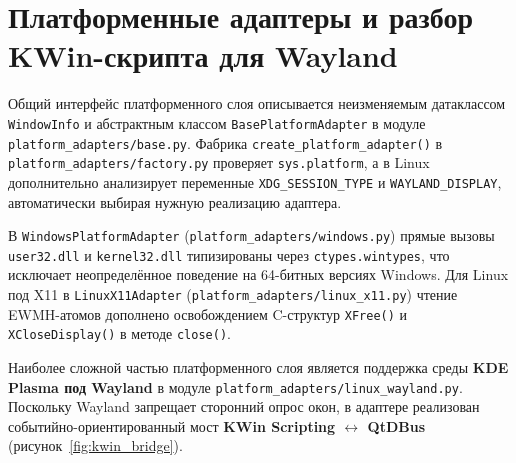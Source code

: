 \documentclass{timcw}
\begin{document}
\section{Платформенные адаптеры и разбор KWin-скрипта для Wayland}

Общий интерфейс платформенного слоя описывается неизменяемым датаклассом \texttt{WindowInfo} и абстрактным классом \texttt{BasePlatformAdapter} в модуле \texttt{platform\_adapters/base.py}. Фабрика \texttt{create\_platform\_adapter()} в \texttt{platform\_adapters/factory.py} проверяет \texttt{sys.platform}, а в Linux дополнительно анализирует переменные \texttt{XDG\_SESSION\_TYPE} и \texttt{WAYLAND\_DISPLAY}, автоматически выбирая нужную реализацию адаптера.

В \texttt{WindowsPlatformAdapter} (\texttt{platform\_adapters/windows.py}) прямые вызовы \texttt{user32.dll} и \texttt{kernel32.dll} типизированы через \texttt{ctypes.wintypes}, что исключает неопределённое поведение на 64-битных версиях Windows. Для Linux под X11 в \texttt{LinuxX11Adapter} (\texttt{platform\_adapters/linux\_x11.py}) чтение EWMH-атомов дополнено освобождением C-структур \texttt{XFree()} и \texttt{XCloseDisplay()} в методе \texttt{close()}.

Наиболее сложной частью платформенного слоя является поддержка среды \textbf{KDE Plasma под Wayland} в модуле \texttt{platform\_adapters/linux\_wayland.py}. Поскольку Wayland запрещает сторонний опрос окон, в адаптере реализован событийно-ориентированный мост \textbf{KWin Scripting $\leftrightarrow$ QtDBus} (рисунок~\ref{fig:kwin_bridge}).
\end{document}
